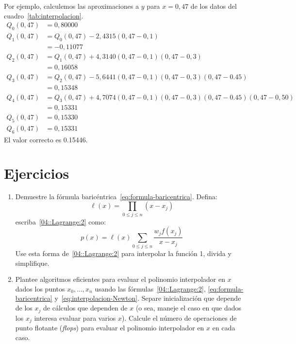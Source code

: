   Por ejemplo,
  calculemos las aproximaciones a \(y\) para \(x = 0,47\)
  de los datos del cuadro~\ref{tab:interpolacion}.
  \begin{align*}
    Q_0(0,47)
      &= 0,80000 \\
    Q_1(0,47)
      &= Q_0(0,47) - 2,4315 (0,47 - 0,1) \\
      &= -0,11077 \\
    Q_2(0,47)
      &= Q_1(0,47) + 4,3140 (0,47 - 0,1) (0,47 - 0,3) \\
      &= 0,16058 \\
    Q_3(0,47)
      &= Q_2(0,47) - 5,6441 (0,47 - 0,1) (0,47 - 0,3) (0,47 - 0.45) \\
      &= 0,15348 \\
    Q_4(0,47)
      &= Q_3(0,47)
           + 4,7074 (0,47 - 0,1) (0,47 - 0,3) (0,47 - 0.45) (0,47 - 0,50) \\
      &= 0,15331 \\
    Q_5(0,47)
      &= 0,15330 \\
    Q_6(0,47)
      &= 0,15331
  \end{align*}
  El valor correcto es \num{0,15446}.

\section*{Ejercicios}
\label{sec:ejercicios-04}

  \begin{enumerate}
  \item
    Demuestre la fórmula baricéntrica~\eqref{eq:formula-baricentrica}.
    Defina:
    \begin{equation*}
      \ell(x)
        = \prod_{0 \le j \le n} (x - x_j)
    \end{equation*}
    escriba~\eqref{04::Lagrange:2} como:
    \begin{equation*}
      p(x)
        = \ell(x) \sum_{0 \le j \le n} \frac{w_j f(x_j)}{x - x_j}
    \end{equation*}
    Use esta forma de~\eqref{04::Lagrange:2} para interpolar la función \num{1},
    divida y simplifique.
  \item
    Plantee algoritmos eficientes
    para evaluar el polinomio interpolador en \(x\)
    dados los puntos \(x_0, \dotsc, x_n\)
    usando las fórmulas~\eqref{04::Lagrange:2},
    \eqref{eq:formula-baricentrica}
    y~\eqref{eq:interpolacion-Newton}.
    Separe inicialización que depende de los \(x_j\)
    de cálculos que dependen de \(x\)
    (o sea,
     maneje el caso en que dados los \(x_j\)
     interesa evaluar para varios \(x\)).
    Calcule el número de operaciones de punto flotante
    (\emph{flops})
    para evaluar el polinomio interpolador en \(x\) en cada caso.
  \end{enumerate}




